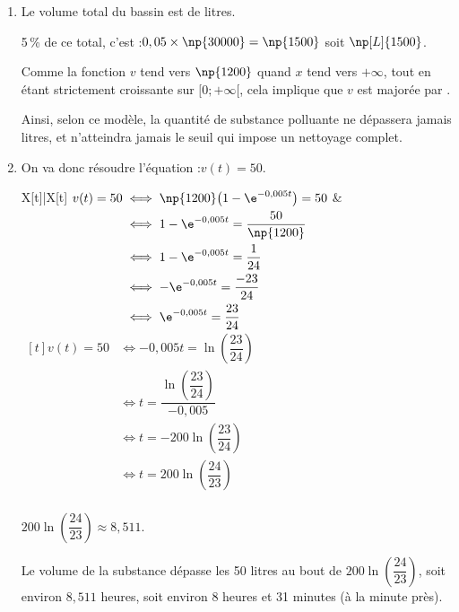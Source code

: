 \begin{enumerate}
\begin{enumerate}
		\item La fonction $v$ est dérivable sur $[0 ; +\infty[$.

		$\forall x \in [0 ; +\infty[,\quad v'(x) = 1200 \times \big(0 - (-0,005)\e^{-0,005t}\big) = 6\e^{-0,005t}$.

		Comme 6 est strictement positif et que la fonction exponentielle est à valeurs strictement positives, on en déduit que la fonction dérivée $v'$ est à valeurs strictement positives sur $[0 ; +\infty[$, et donc que la fonction $v$ est strictement croissante sur cet intervalle.
	\end{enumerate}

	\item Le volume total du bassin est de  litres.

	5\,\% de ce total, c'est :\quad $0,05\times \np{30000} = \np{1500}$ soit  $\np[L]{1500}$.

	Comme la fonction $v$ tend vers $$ quand $x$ tend vers $+\infty$, tout en étant strictement croissante sur $[0 ; +\infty[$, cela implique que $v$ est majorée par \np{1200}.

	Ainsi, selon ce modèle, la quantité de substance polluante ne dépassera jamais  litres, et n'atteindra jamais le seuil qui impose un nettoyage complet.

	\item On va donc résoudre l'équation :\quad $v(t) = 50$.

	\begin{tblr}{X[t]|X[t]}
		$\begin{aligned}[t]
		v(t) = 50
		&\iff \np{1200}\big(1 - \e^{-0,005t}\big)	= 50\\
		&\iff 1 - \e^{-0,005t}	= \dfrac{50}{\np{1200}}\\
		&\iff 1 - \e^{-0,005t}	= \dfrac{1}{24}\\
		&\iff - \e^{-0,005t}	= \dfrac{-23}{24}\\
		&\iff \e^{-0,005t}	= \dfrac{23}{24}\\
	\end{aligned}$
	&
	$\begin{aligned}[t]
		v(t) = 50
		&\iff -0,005t	= \ln\left(\dfrac{23}{24}\right) \\
		&\iff t	= \dfrac{\ln\left(\dfrac{23}{24}\right)}{-0,005}\\
		&\iff t = -200\ln\left(\dfrac{23}{24}\right) \\
		&\iff t = 200\ln\left(\dfrac{24}{23}\right)\\
	\end{aligned}$
	\end{tblr}

	$200\ln\left(\dfrac{24}{23}\right)\approx 8,511$.

	Le volume de la substance dépasse les 50 litres au bout de $200\ln\left(\dfrac{24}{23}\right)$, soit environ $8,511$ heures, soit environ 8 heures et 31 minutes (à la minute près).
\end{enumerate}

